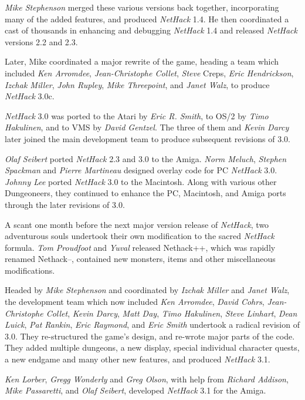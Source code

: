 {\it Mike Stephenson\/} merged these various versions back together,
incorporating many of the added features, and produced {\it NetHack\/} 1.4.
He then coordinated a cast of thousands in enhancing and debugging
{\it NetHack\/} 1.4 and released {\it NetHack\/} versions 2.2 and 2.3.

Later, Mike coordinated a major rewrite of the game, heading a
team which included {\it Ken Arromdee}, {\it Jean-Christophe Collet}, {\it Steve}
Creps, {\it Eric Hendrickson}, {\it Izchak Miller}, {\it John Rupley},
{\it Mike Threepoint}, and {\it Janet Walz}, to produce {\it NetHack\/} 3.0c.

{\it NetHack\/} 3.0 was ported to the Atari by {\it Eric R. Smith}, to OS/2 by
{\it Timo Hakulinen}, and to VMS by {\it David Gentzel}.  The three of them
and {\it Kevin Darcy\/} later joined the main development team to produce
subsequent revisions of 3.0.

{\it Olaf Seibert\/} ported {\it NetHack\/} 2.3 and 3.0 to the Amiga.
{\it Norm Meluch}, {\it Stephen Spackman\/} and {\it Pierre Martineau\/} designed
overlay code for PC {\it NetHack\/} 3.0.  {\it Johnny Lee\/} ported
{\it NetHack\/} 3.0 to the Macintosh.  Along with various other Dungeoneers, they
continued to enhance the PC, Macintosh, and Amiga ports through the later
revisions of 3.0.

A scant one month before the next major version release of {\it NetHack}, two
adventurous souls undertook their own modification to the sacred {\it NetHack\/}
formula. {\it Tom Proudfoot\/} and {\it Yuval\/} released Nethack++,  which was
rapidly renamed Nethack--,  contained new monsters,  items and
other miscellaneous modifications.

Headed by {\it Mike Stephenson\/} and coordinated by {\it Izchak Miller\/} and
{\it Janet Walz}, the development team which now included {\it Ken Arromdee},
{\it David Cohrs}, {\it Jean-Christophe Collet}, {\it Kevin Darcy},
{\it Matt Day}, {\it Timo Hakulinen}, {\it Steve Linhart}, {\it Dean Luick},
{\it Pat Rankin}, {\it Eric Raymond}, and {\it Eric Smith\/} undertook a radical
revision of 3.0.  They re-structured the game's design, and re-wrote major
parts of the code.  They added multiple dungeons, a new display, special
individual character quests, a new endgame and many other new features, and
produced {\it NetHack\/} 3.1.

{\it Ken Lorber}, {\it Gregg Wonderly\/} and {\it Greg Olson}, with help
from {\it Richard Addison}, {\it Mike Passaretti}, and {\it Olaf Seibert},
developed {\it NetHack\/} 3.1 for the Amiga.

